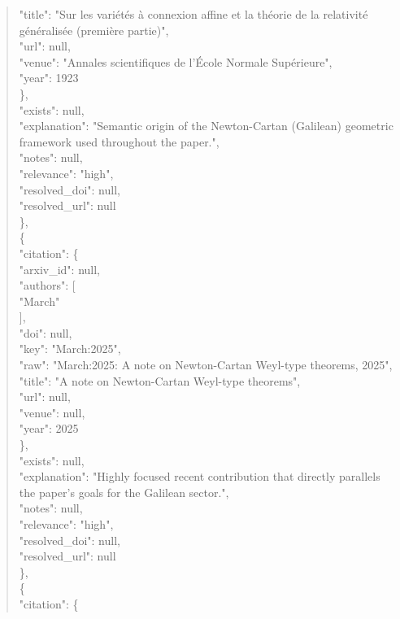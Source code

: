 \documentclass[11pt]{article}
\begin{document}
\begin{quote}
        "title": "Sur les variétés à connexion affine et la théorie de la relativité généralisée (première partie)",\\
        "url": null,\\
        "venue": "Annales scientifiques de l'École Normale Supérieure",\\
        "year": 1923\\
      \},\\
      "exists": null,\\
      "explanation": "Semantic origin of the Newton-Cartan (Galilean) geometric framework used throughout the paper.",\\
      "notes": null,\\
      "relevance": "high",\\
      "resolved\_doi": null,\\
      "resolved\_url": null\\
    \},\\
    \{\\
      "citation": \{\\
        "arxiv\_id": null,\\
        "authors": [\\
          "March"\\
        ],\\
        "doi": null,\\
        "key": "March:2025",\\
        "raw": "March:2025: A note on Newton-Cartan Weyl-type theorems, 2025",\\
        "title": "A note on Newton-Cartan Weyl-type theorems",\\
        "url": null,\\
        "venue": null,\\
        "year": 2025\\
      \},\\
      "exists": null,\\
      "explanation": "Highly focused recent contribution that directly parallels the paper's goals for the Galilean sector.",\\
      "notes": null,\\
      "relevance": "high",\\
      "resolved\_doi": null,\\
      "resolved\_url": null\\
    \},\\
    \{\\
      "citation": \{\\

\end{quote}
\end{document}
